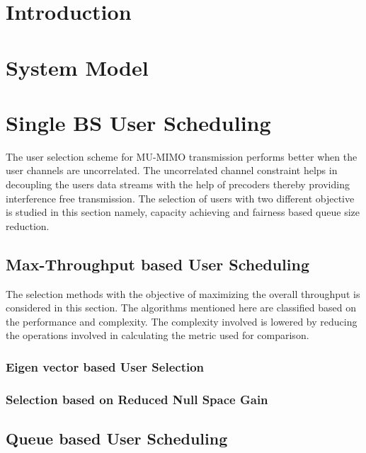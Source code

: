 \documentclass[a4paper,11pt,draft,fleqn,onecolumn]{report}
\begin{document}


\section{Introduction}

\section{System Model}



\section{Single BS User Scheduling}

The user selection scheme for MU-MIMO transmission performs better when the user  channels are uncorrelated. The uncorrelated channel constraint helps in decoupling the users data streams with the help of precoders thereby providing interference free transmission. The selection of users with two different objective is studied in this section namely, capacity achieving and fairness based queue size reduction.

\subsection{Max-Throughput based User Scheduling}

The selection methods with the objective of maximizing the overall throughput is considered in this section. The algorithms mentioned here are classified based on the performance and complexity. The complexity involved is lowered by reducing the operations involved in calculating the metric used for comparison.

\subsubsection{Eigen vector based User Selection}



\subsubsection{Selection based on Reduced Null Space Gain}



\subsection{Queue based User Scheduling}
\end{document}
